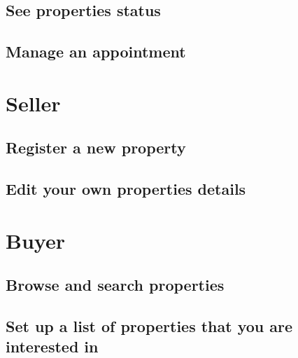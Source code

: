 \documentclass[a4paper,12pt]{article}
\begin{document}
\subsection{See properties status}
\subsection{Manage an appointment}

\section{Seller}
\subsection{Register a new property}
\subsection{Edit your own properties details}

\section{Buyer}
\subsection{Browse and search properties}
\subsection{Set up a list of properties that you are interested in}
\end{document}
